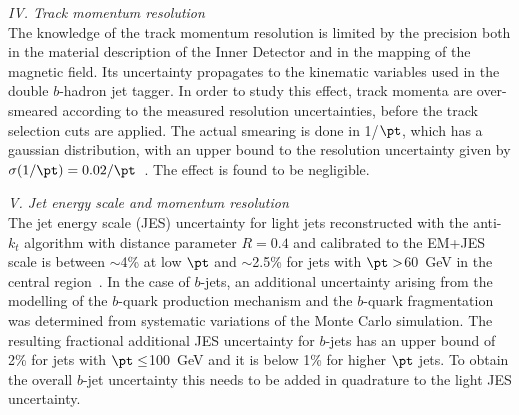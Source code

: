 \vspace{3mm}
{\em IV. Track momentum resolution}
\\[3mm]
The knowledge of the track momentum resolution is limited by the precision both in the material description of the Inner Detector and in the mapping of the magnetic field. Its uncertainty propagates to the kinematic variables used in the double $b$-hadron jet tagger. In order to study this effect, track momenta are over-smeared according to the measured resolution uncertainties, before the track selection cuts are applied.  %
The actual smearing is done in 1/$\pt$, which has a gaussian distribution, with an upper bound to the resolution uncertainty given by $\sigma(1/\pt)=0.02/\pt$~\cite{ATLAS-CONF-2010-009}. The effect is found to be negligible. %



\vspace{3mm}
{ \em V. Jet energy scale and momentum resolution}
\\[3mm]
The jet energy scale (JES) uncertainty for light jets reconstructed with the anti-$k_t$ algorithm with distance parameter $R=0.4$ and calibrated to the  EM+JES scale is between $\sim$4\% at low $\pt$ and $\sim$2.5\% for jets with  $\pt > $60~GeV in the central region~\cite{JESUncertainty}. In the case of $b$-jets, an additional uncertainty arising from the modelling of the $b$-quark production mechanism and the $b$-quark fragmentation was determined from systematic variations of the Monte Carlo simulation. %
The resulting fractional additional JES uncertainty for $b$-jets has an upper bound of 2\% for jets with $\pt \leq$100~GeV and it is below 1\% for higher $\pt$ jets. To obtain the overall $b$-jet uncertainty this needs to be added in quadrature to the light JES uncertainty. 

